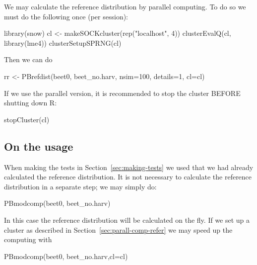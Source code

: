 \documentclass[12pt]{article}
\begin{document}
We may calculate the reference distribution by parallel computing.
To do so we must do the following once (per session):

\begin{Schunk}
\begin{Sinput}
 library(snow)
 cl <- makeSOCKcluster(rep("localhost", 4))
 clusterEvalQ(cl, library(lme4))
 clusterSetupSPRNG(cl)
\end{Sinput}
\end{Schunk}

Then we can do

\begin{Schunk}
\begin{Sinput}
 rr <- PBrefdist(beet0, beet_no.harv, nsim=100, details=1, cl=cl)
\end{Sinput}
\end{Schunk}

If we use the parallel version, it is recommended to stop the cluster
BEFORE shutting down R:

\begin{Schunk}
\begin{Sinput}
 stopCluster(cl)
\end{Sinput}
\end{Schunk}

\subsection{On the usage}
\label{sec:usage}

When making the tests in Section~\ref{sec:making-tests} we used that
we had already calculated the reference distribution. It is not
necessary to calculate the reference distribution in a separate step;
we may simply do:

\begin{Schunk}
\begin{Sinput}
 PBmodcomp(beet0, beet_no.harv)
\end{Sinput}
\end{Schunk}

In this case the reference distribution will be calculated on the
fly. If we set up a cluster as described in
Section~\ref{sec:parall-comp-refer} we may speed up the computing with

\begin{Schunk}
\begin{Sinput}
 PBmodcomp(beet0, beet_no.harv,cl=cl)
\end{Sinput}
\end{Schunk}
\end{document}
